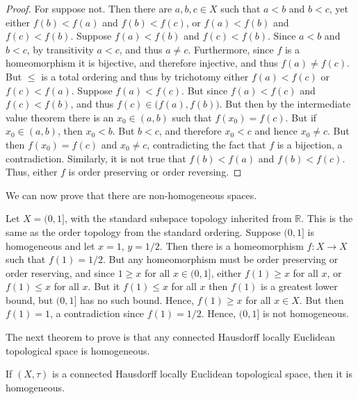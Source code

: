 \documentclass[oneside]{book}                                                  %
\begin{document}
            \begin{proof}
                For suppose not. Then there are $a,b,c\in{X}$ such that
                $a<b$ and $b<c$, yet either $f(b)<f(a)$ and $f(b)<f(c)$, or
                $f(a)<f(b)$ and $f(c)<f(b)$. Suppose $f(a)<f(b)$ and
                $f(c)<f(b)$. Since $a<b$ and $b<c$, by transitivity $a<c$, and
                thus $a\ne{c}$. Furthermore, since $f$ is a homeomorphism it is
                bijective, and therefore injective, and thus $f(a)\ne{f}(c)$.
                But $\leq$ is a total ordering and thus by trichotomy either
                $f(a)<f(c)$ or $f(c)<f(a)$. Suppose $f(a)<f(c)$. But since
                $f(a)<f(c)$ and $f(c)<f(b)$, and thus
                $f(c)\in\big(f(a),f(b)\big)$. But then by the intermediate value
                theorem there is an $x_{0}\in(a,b)$ such that $f(x_{0})=f(c)$.
                But if $x_{0}\in(a,b)$, then $x_{0}<b$. But $b<c$, and therefore
                $x_{0}<c$ and hence $x_{0}\ne{c}$. But then $f(x_{0})=f(c)$ and
                $x_{0}\ne{c}$, contradicting the fact that $f$ is a bijection,
                a contradiction. Similarly, it is not true that $f(b)<f(a)$ and
                $f(b)<f(c)$. Thus, either $f$ is order preserving or order
                reversing.
            \end{proof}
            We can now prove that there are non-homogeneous spaces.
            \begin{example}
                Let $X=(0,1]$, with the standard subspace topology inherited
                from $\mathbb{R}$. This is the same as the order topology from
                the standard ordering. Suppose $(0,1]$ is homogeneous and let
                $x=1$, $y=1/2$. Then there is a homeomorphism
                $f:X\rightarrow{X}$ such that $f(1)=1/2$. But any homeomorphism
                must be order preserving or order reserving, and since
                $1\geq{x}$ for all $x\in(0,1]$, either $f(1)\geq{x}$ for all
                $x$, or $f(1)\leq{x}$ for all $x$. But it $f(1)\leq{x}$ for all
                $x$ then $f(1)$ is a greatest lower bound, but $(0,1]$ has no
                such bound. Hence, $f(1)\geq{x}$ for all $x\in{X}$. But then
                $f(1)=1$, a contradiction since $f(1)=1/2$. Hence, $(0,1]$ is
                not homogeneous.
            \end{example}
            The next theorem to prove is that any connected Hausdorff locally
            Euclidean topological space is homogeneous.
            \begin{theorem}
                If $(X,\tau)$ is a connected Hausdorff locally Euclidean
                topological space, then it is homogeneous.
            \end{theorem}
\end{document}
